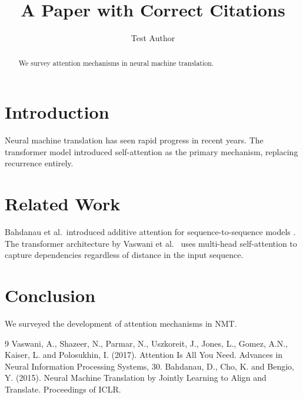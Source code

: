 \documentclass{article}
\title{A Paper with Correct Citations}
\author{Test Author}
\begin{document}
\maketitle

\begin{abstract}
We survey attention mechanisms in neural machine translation.
\end{abstract}

\section{Introduction}
\label{sec:intro}

Neural machine translation has seen rapid progress in recent years.
The transformer model \cite{vaswani2017} introduced self-attention as the primary mechanism,
replacing recurrence entirely.

\section{Related Work}
\label{sec:related}

Bahdanau et al.\ introduced additive attention for sequence-to-sequence models \cite{bahdanau2015}.
The transformer architecture by Vaswani et al.\ \cite{vaswani2017} uses multi-head self-attention
to capture dependencies regardless of distance in the input sequence.

\section{Conclusion}
\label{sec:conclusion}

We surveyed the development of attention mechanisms in NMT.

\begin{thebibliography}{9}
 Vaswani, A., Shazeer, N., Parmar, N., Uszkoreit, J., Jones, L., Gomez, A.N., Kaiser, L. and Polosukhin, I. (2017). Attention Is All You Need. Advances in Neural Information Processing Systems, 30.
 Bahdanau, D., Cho, K. and Bengio, Y. (2015). Neural Machine Translation by Jointly Learning to Align and Translate. Proceedings of ICLR.
\end{thebibliography}
\end{document}
